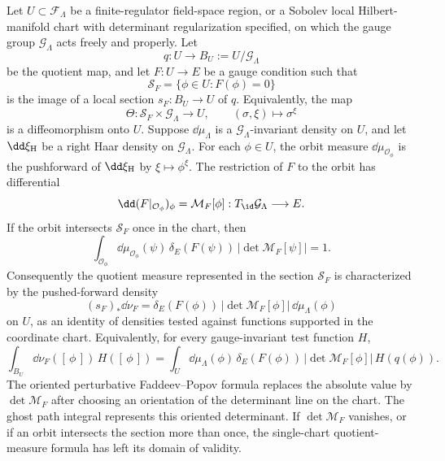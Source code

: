 \begin{proposition}
\label{prop:fp-orbit-measure-construction}
Let \(U\subset\mathcal F_\Lambda\) be a finite-regulator field-space region, or
a Sobolev local Hilbert-manifold chart with determinant regularization
specified, on which the gauge group \(\mathcal G_\Lambda\) acts freely and
properly.  Let
\[
  q:U\longrightarrow B_U:=U/\mathcal G_\Lambda
\]
be the quotient map, and let \(F:U\to E\) be a gauge condition such that
\[
  \mathcal S_F=\{\phi\in U:F(\phi)=0\}
\]
is the image of a local section \(s_F:B_U\to U\) of \(q\).  Equivalently, the
map
\[
  \Theta:\mathcal S_F\times\mathcal G_\Lambda\longrightarrow U,
  \qquad
  (\sigma,\xi)\longmapsto \sigma^\xi
\]
is a diffeomorphism onto \(U\).  Suppose \(\dd\mu_\Lambda\) is a
\(\mathcal G_\Lambda\)-invariant density on \(U\), and let
\(\dd\xi_{\rm H}\) be a right Haar density on \(\mathcal G_\Lambda\).  For each
\(\phi\in U\), the orbit measure \(\dd\mu_{\mathcal O_\phi}\) is the pushforward
of \(\dd\xi_{\rm H}\) by \(\xi\mapsto\phi^\xi\).  The restriction of \(F\) to
the orbit has differential
\[
  \dd(F|_{\mathcal O_\phi})_\phi
  =
  \mathcal M_F[\phi]:
  T_{\id}\mathcal G_\Lambda\longrightarrow E .
\]
If the orbit intersects \(\mathcal S_F\) once in the chart, then
\begin{equation}
  \int_{\mathcal O_\phi}\dd\mu_{\mathcal O_\phi}(\psi)\,
  \delta_E(F(\psi))\,\bigl|\det\mathcal M_F[\psi]\bigr|
  =
  1 .
  \label{eq:fp-orbit-delta-density}
\end{equation}
Consequently the quotient measure represented in the section \(\mathcal S_F\)
is characterized by the pushed-forward density
\begin{equation}
  (s_F)_*\dd\nu_F
  =
  \delta_E(F(\phi))\,\bigl|\det\mathcal M_F[\phi]\bigr|\,
  \dd\mu_\Lambda(\phi)
  \label{eq:fp-quotient-density-section}
\end{equation}
on \(U\), as an identity of densities tested against functions supported in the
coordinate chart.  Equivalently, for every gauge-invariant test function \(H\),
\begin{equation}
  \int_{B_U}\dd\nu_F([\,\phi\,])\,H([\,\phi\,])
  =
  \int_U\dd\mu_\Lambda(\phi)\,
  \delta_E(F(\phi))\,\bigl|\det\mathcal M_F[\phi]\bigr|\,
  H(q(\phi)).
  \label{eq:fp-quotient-measure}
\end{equation}
The oriented perturbative Faddeev--Popov formula replaces the absolute value by
\(\det\mathcal M_F\) after choosing an orientation of the determinant line on
the chart.  The ghost path integral represents this oriented determinant.  If
\(\det\mathcal M_F\) vanishes, or if an orbit intersects the section more than
once, the single-chart quotient-measure formula has left its domain of
validity.
\end{proposition}

